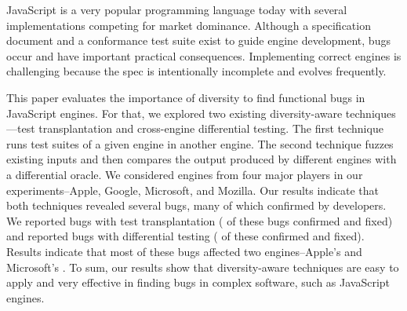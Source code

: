 JavaScript is a very popular programming language today with several
implementations competing for market dominance. Although a
specification document and a conformance test suite exist to guide
engine development, bugs occur and have important practical
consequences. Implementing correct
engines is challenging because the spec is intentionally
incomplete and evolves frequently.

\sloppy
This paper evaluates the importance of
diversity to find functional bugs in JavaScript engines. For that, we
explored two existing diversity-aware techniques---test transplantation and
cross-engine differential testing. The first technique runs test
suites of a given engine in another engine. The second technique
fuzzes existing inputs and then compares the output produced by
different engines with a differential oracle.
We considered engines from four major players in our
experiments--Apple, Google, Microsoft, and Mozilla. Our results
indicate that both techniques revealed several bugs, many of which
confirmed by developers. We reported \noBugsTransplantation{} bugs
with test transplantation (\noBugsTransplantationConfirmed{} of these bugs
confirmed and \noBugsTransplantationFixed{} fixed) and reported
\noBugsDifferentialTesting{} bugs with differential testing
(\noBugsDifferentialTestingConfirmed{} of these confirmed
and \noBugsDifferentialTestingFixed{} fixed). Results indicate that
most of these bugs affected two engines--Apple's
\jsc{} and Microsoft's \chakra{}. To sum, our results show that
diversity-aware techniques are easy to apply and very effective in
finding bugs in complex software, such as JavaScript engines.
